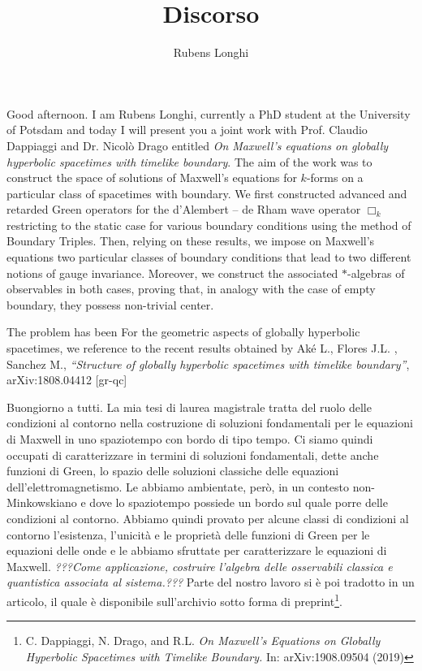 \documentclass[11pt,a4paper]{article}
\author{Rubens Longhi}
\title{Discorso}
\begin{document}
	\maketitle
	Good afternoon. I am Rubens Longhi, currently a PhD student at the University of Potsdam and today I will present you a joint work with Prof. Claudio Dappiaggi and Dr. Nicolò Drago entitled \emph{On Maxwell's equations on globally hyperbolic spacetimes with timelike boundary}. The aim of the work was to construct the space of solutions of Maxwell's equations for $k$-forms on a particular class of spacetimes with boundary. We first constructed advanced and retarded Green operators for the d'Alembert -- de Rham wave operator $\Box_k$ restricting to the static case for various boundary conditions using the method of Boundary Triples. Then, relying on these results, we impose on Maxwell's equations two particular classes of boundary conditions that lead to two different notions of gauge invariance. Moreover, we construct the associated $*$-algebras of observables in both cases, proving that, in analogy with the case of empty boundary, they possess non-trivial center.
	
	The problem has been
	For the geometric aspects of globally hyperbolic spacetimes, we reference to the recent results obtained by
	Ak\'e L., Flores J.L. , Sanchez M.,
	\textit{``Structure of globally hyperbolic spacetimes with timelike boundary''},
	arXiv:1808.04412 [gr-qc]
	
	
	
	
	
	
	
	
	
	Buongiorno a tutti. La mia tesi di laurea magistrale tratta del ruolo delle condizioni al contorno nella costruzione di soluzioni fondamentali per le equazioni di Maxwell in uno spaziotempo con bordo di tipo tempo. Ci siamo quindi occupati di caratterizzare in termini di soluzioni fondamentali, dette anche funzioni di Green, lo spazio delle soluzioni classiche delle equazioni dell'elettromagnetismo. Le abbiamo ambientate, però, in un contesto non-Minkowskiano e dove lo spaziotempo possiede un bordo sul quale porre delle condizioni al contorno. Abbiamo quindi provato per alcune classi di condizioni al contorno l'esistenza, l'unicità e le proprietà delle funzioni di Green per le equazioni delle onde e le abbiamo sfruttate per caratterizzare le equazioni di Maxwell. \textit{???Come applicazione, costruire l'algebra delle osservabili classica e quantistica associata al sistema.???} Parte del nostro lavoro si è poi tradotto in un articolo, il quale è disponibile sull'archivio sotto forma di preprint\footnote{C. Dappiaggi, N. Drago, and R.L. \emph{On Maxwell’s Equations
		on Globally Hyperbolic Spacetimes with Timelike Boundary.} In: arXiv:1908.09504 (2019)}. \\
	
\end{document}
